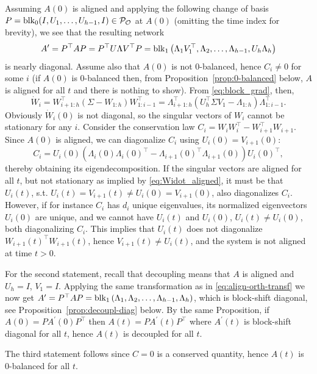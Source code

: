 \documentclass{article}
\makeatletter
\renewenvironment{proof}[1][\proofname]{
  \par\pushQED{\qed}\normalfont
  \topsep6\p@\@plus6\p@\relax
  \trivlist\item[\hskip\labelsep\bfseries#1\@addpunct{.}]
  \ignorespaces
}{
  \popQED\endtrivlist\@endpefalse
}
\def\block{{\rm blk}}
\newcommand{\1}{\mathds{1}}
\makeatother
\begin{document}
\begin{proof}
Assuming $ A(0) $ is aligned and applying the following change of basis $ P = \block_0(I,U_1, \ldots, U_{h-1}, I) \in \mathcal{P_O}$ at $ A(0)$ (omitting the time index for brevity), we see that the resulting network
\begin{equation}
    A^\prime = P^\top A P = P^\top U \Lambda  V^\top  P = \block_1 \left( \Lambda_1 V_1^\top, \Lambda_2, \ldots, \Lambda_{h-1}, U_h \Lambda_h \right)
    \label{eq:align-orth-transf}
\end{equation}
 is nearly diagonal.
 Assume also that $ A(0) $ is not 0-balanced, hence $ C_i \neq 0 $ for some $ i $ (if $ A(0) $ is 0-balanced then, from Proposition~\ref{prop:0-balanced} below, $A$ is aligned for all $t$ and there is nothing to show).
From \eqref{eq:block_grad}, then,  
\begin{equation}
    \label{eq:Widot_aligned}
    \dot{ W }_i = W_{i+1:h}^\top (\Sigma - W_{1:h}) W_{1:i-1}^\top = \Lambda_{i+1:h}^\top (U_h^\top \Sigma V_1 - \Lambda_{1:h}) \Lambda_{1:i-1}^\top .
\end{equation}
Obviously $ \dot{ W }_i(0) $ is not diagonal, so the singular vectors of $ W_i $ cannot be stationary for any $ i $. Consider the conservation law $ C_i = W_i W_i^\top - W_{i+1}^\top W_{i+1} $. Since $ A(0) $ is aligned, we can diagonalize $ C_i $ using $ U_i(0) = V_{i+1}(0) $:
\begin{equation*}
     C_i  = U_i(0) ( \Lambda_i(0) \Lambda_i(0)^\top - \Lambda_{i+1}(0)^\top \Lambda_{i+1}(0) ) U_i(0)^\top,
\end{equation*}
thereby obtaining its eigendecomposition. 
If the singular vectors are aligned for all $ t $, but not stationary as implied by \eqref{eq:Widot_aligned}, it must be that $ U_i(t)$, s.t. $ U_i(t) = V_{i+1}(t) \neq U_i(0) = V_{i+1}(0) $, also diagonalizes $ C_i $. However, if for instance $ C_i $ has $ d_i $ unique eigenvalues, its normalized eigenvectors $ U_i(0) $ are unique, and we cannot have $ U_i(t)$ and $ U_i(0) $, $ U_i(t) \neq U_i(0) $, both diagonalizing $ C_i $. This implies that $ U_i(t) $ does not diagonalize $ W_{i+1}(t)^\top W_{i+1}(t) $, hence $ V_{i+1}(t) \neq U_i(t) $, and the system is not aligned at time $ t > 0 $. 

For the second statement, recall that decoupling means that $ A $ is aligned and $ U_h = I $, $ V_1 = I$. Applying the same transformation as in \eqref{eq:align-orth-transf} we now get $ A^\prime = P^\top A P = \block_1 \left( \Lambda_1, \Lambda_2, \ldots, \Lambda_{h-1}, \Lambda_h \right) $, which is block-shift diagonal, see Proposition~\ref{prop:decoupl-diag} below. By the same Proposition, if $ A(0) = P A^\prime(0) P^\top $ then $ A(t) = P A^\prime(t) P^\top $ where $ A^\prime(t) $ is block-shift diagonal for all $ t $, hence $ A(t) $ is decoupled for all $ t $.

The third statement follows since $ C = 0 $ is a conserved quantity, hence $ A(t) $ is 0-balanced for all $ t $.

\end{proof}
\end{document}

